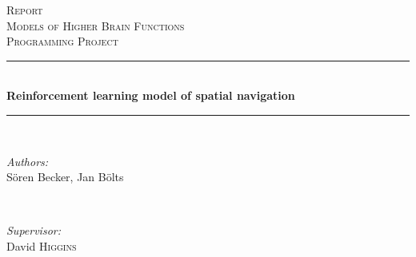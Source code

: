 \begin{titlepage}

\newcommand{\HRule}{\rule{\linewidth}{0.5mm}} %

\center %
 

\textsc{\LARGE Report}\\[1.2cm] %
\textsc{\Large Models of Higher Brain Functions}\\[0.3cm] %
\textsc{\large Programming Project}\\[0.5cm] %


\HRule \\[0.4cm]
{ \huge \bfseries Reinforcement learning model of spatial navigation}\\[0.4cm] %
\HRule \\[1.5cm]
 

\begin{minipage}{0.4\textwidth}
\begin{flushleft} \large
\emph{Authors:}\\
Sören Becker, Jan Bölts %
\end{flushleft}
\end{minipage}
~
\begin{minipage}{0.4\textwidth}
\begin{flushright} \large
\emph{Supervisor:} \\
David \textsc{Higgins} %
\end{flushright}
\end{minipage}\\[1cm]



\end{titlepage}
